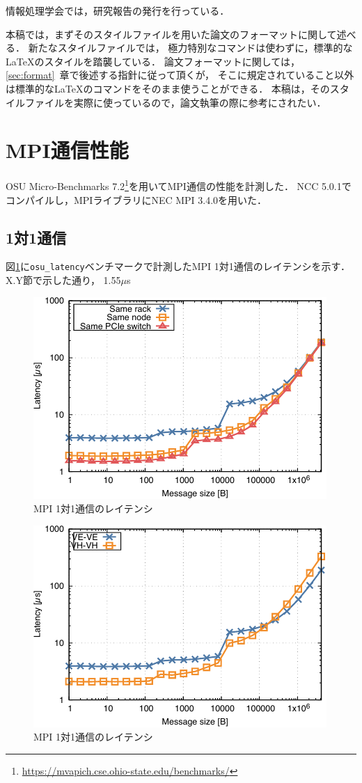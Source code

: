 ﻿\documentclass[submit,techrep,noauthor]{ipsj}
\begin{document}
情報処理学会では，研究報告の発行を行っている．

本稿では，まずそのスタイルファイルを用いた論文のフォーマットに関して述べる．
新たなスタイルファイルでは，
極力特別なコマンドは使わずに，標準的な\LaTeX のスタイルを踏襲している．
論文フォーマットに関しては，\ref{sec:format}~章で後述する指針に従って頂くが，
そこに規定されていること以外は標準的な\LaTeX のコマンドをそのまま使うことができる．
本稿は，そのスタイルファイルを実際に使っているので，論文執筆の際に参考にされたい．


\section{MPI通信性能}

OSU Micro-Benchmarks
7.2\footnote{\url{https://mvapich.cse.ohio-state.edu/benchmarks/}}を用いてMPI通信の性能を計測した．
NCC 5.0.1でコンパイルし，MPIライブラリにNEC MPI 3.4.0を用いた．

\subsection{1対1通信}

図\ref{fig:mpi-lat}に\verb|osu_latency|ベンチマークで計測したMPI 1対1通信のレイテンシを示す．
X.Y節で示した通り，
1.55$\mu$s

\begin{figure}
  \centering
  \includegraphics{figs/mpi_latency.pdf}
  \caption{MPI 1対1通信のレイテンシ}\label{fig:mpi-lat}
\end{figure}

\begin{figure}
  \centering
  \includegraphics{figs/mpi_latency_vhve.pdf}
  \caption{MPI 1対1通信のレイテンシ}\label{fig:mpi-lat-vh}
\end{figure}
\end{document}
